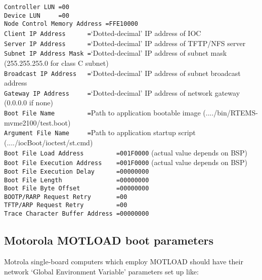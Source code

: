 \noindent
\verb|Controller LUN =00|\\
\verb|Device LUN     =00|\\
\verb|Node Control Memory Address =FFE10000|\\
\verb|Client IP Address      =|`Dotted-decimal' IP address of IOC\\
\verb|Server IP Address      =|`Dotted-decimal' IP address of TFTP/NFS server\\
\verb|Subnet IP Address Mask =|`Dotted-decimal' IP address of subnet mask (255.255.255.0 for class C subnet)\\
\verb|Broadcast IP Address   =|`Dotted-decimal' IP address of subnet broadcast address\\
\verb|Gateway IP Address     =|`Dotted-decimal' IP address of network gateway (0.0.0.0 if none)\\
\verb|Boot File Name         =|Path to application bootable image (..../bin/RTEMS-mvme2100/test.boot)\\
\verb|Argument File Name     =|Path to application startup script (..../iocBoot/ioctest/st.cmd)\\
\verb|Boot File Load Address         =001F0000| (actual value depends on BSP)\\
\verb|Boot File Execution Address    =001F0000| (actual value depends on BSP)\\
\verb|Boot File Execution Delay      =00000000|\\
\verb|Boot File Length               =00000000|\\
\verb|Boot File Byte Offset          =00000000|\\
\verb|BOOTP/RARP Request Retry       =00      |\\
\verb|TFTP/ARP Request Retry         =00      |\\
\verb|Trace Character Buffer Address =00000000|

\subsection{Motorola MOTLOAD boot parameters}

Motrola single-board computers which employ MOTLOAD should have their network `Global Environment Variable' 
parameters set up like:

